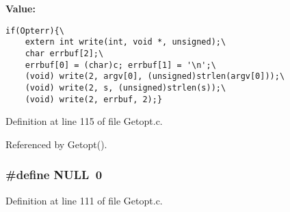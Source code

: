 {\bf Value:}

\footnotesize\begin{verbatim}if(Opterr){\
    extern int write(int, void *, unsigned);\
    char errbuf[2];\
    errbuf[0] = (char)c; errbuf[1] = '\n';\
    (void) write(2, argv[0], (unsigned)strlen(argv[0]));\
    (void) write(2, s, (unsigned)strlen(s));\
    (void) write(2, errbuf, 2);}
\end{verbatim}\normalsize 


Definition at line 115 of file Getopt.c.

Referenced by Getopt().
\subsubsection{\setlength{\rightskip}{0pt plus 5cm}\#define NULL\ 0}\label{Getopt_8c_a0}




Definition at line 111 of file Getopt.c.


